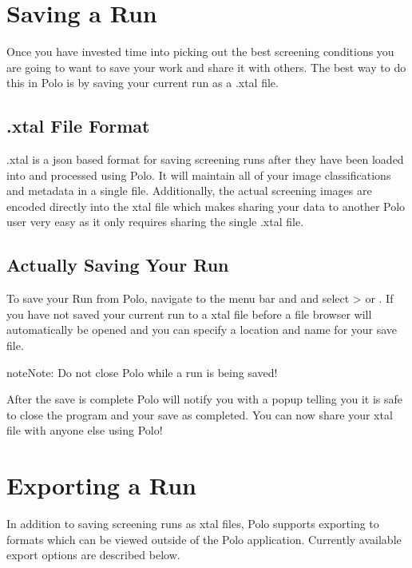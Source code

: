 \documentclass[letterpaper,10pt,english]{sphinxmanual}
\begin{document}
\section{Saving a Run}
\label{\detokenize{user_guide:saving-a-run}}
Once you have invested time into picking out the best screening conditions you
are going to want to save your work and share it with others. The best way to
do this in Polo is by saving your current run as a .xtal file.


\subsection{.xtal File Format}
\label{\detokenize{user_guide:xtal-file-format}}
.xtal is a json based format for saving screening runs after they have been
loaded into and processed using Polo. It will maintain all of your image
classifications and metadata in a single file. Additionally, the actual
screening images are encoded directly into the xtal file which makes sharing
your data to another Polo user very easy as it only requires sharing the
single .xtal file.


\subsection{Actually Saving Your Run}
\label{\detokenize{user_guide:actually-saving-your-run}}
To save your Run from Polo, navigate to the menu bar and and select
 \sphinxhyphen{}\textgreater{}  or . If you have not saved your current run
to a xtal file before a file browser will automatically be opened and you
can specify a location and name for your save file.

\begin{sphinxadmonition}{note}{Note:}
Do not close Polo while a run is being saved!
\end{sphinxadmonition}

After the save is complete Polo will notify you with a popup telling you it
is safe to close the program and your save as completed. You can now share
your xtal file with anyone else using Polo!


\section{Exporting a Run}
\label{\detokenize{user_guide:exporting-a-run}}
In addition to saving screening runs as xtal files, Polo supports exporting
to formats which can be viewed outside of the Polo application. Currently
available export options are described below.
\end{document}
